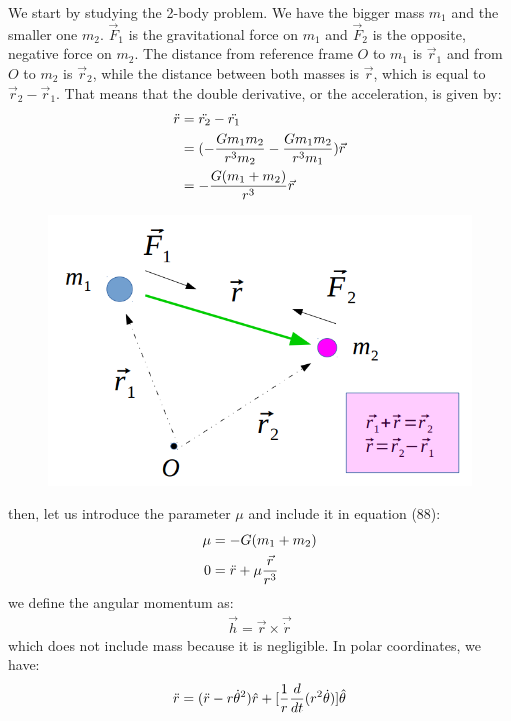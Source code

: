 \documentclass[12pt,a4paper]{article}
\begin{document}
We start by studying the 2-body problem. We have the bigger mass $m_1$ and the smaller one $m_2$. $\Vec{F}_1$ is the gravitational force on $m_1$ and $\Vec{F}_2$ is the opposite, negative force on $m_2$. The distance from reference frame $O$ to $m_1$ is $\Vec{r}_1$ and from $O$ to $m_2$ is $\Vec{r}_2$, while the distance between both masses is $\Vec{r}$, which is equal to $\Vec{r}_2-\Vec{r}_1$. That means that the double derivative, or the acceleration, is given by:
\begin{align}
\begin{split}
    \Ddot{r}&=\Ddot{r_2}-\Ddot{r_1} \\
    &=(-\frac{Gm_1m_2}{r^3m_2}-\frac{Gm_1m_2}{r^3m_1})\Vec{r} \\
    &=-\frac{G(m_1+m_2)}{r^3}\Vec{r} 
\end{split}
\end{align}
\begin{figure}
\includegraphics[scale=0.4]{5}
\end{figure}
then, let us introduce the parameter $\mu$ and include it in equation (88):
\begin{align}
    \mu&=-G(m_1+m_2) \\
    0&=\Ddot{r}+\mu\frac{\Vec{r}}{r^3}
\end{align}
we define the angular momentum as:
\begin{align}
    \Vec{h}=\Vec{r}\times\Vec{\dot{r}}
\end{align}
which does not include mass because it is negligible. In polar coordinates, we have:
\begin{align}
    \Ddot{r}=(\Ddot{r}-r\dot{\theta}^2)\hat{r}+[\frac{1}{r}\frac{d}{dt}(r^2\dot{\theta})]\hat{\theta}
\end{align}
\end{document}
